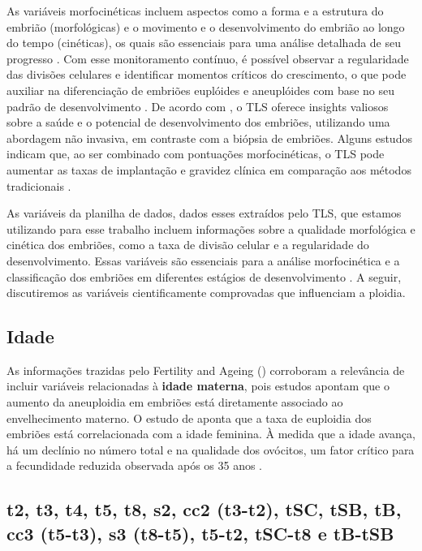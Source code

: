 As variáveis morfocinéticas incluem aspectos como a forma e a estrutura do embrião (morfológicas) e o movimento e o desenvolvimento do embrião ao longo do tempo (cinéticas), os quais são essenciais para uma análise detalhada de seu progresso \cite{gleicher2021}. Com esse monitoramento contínuo, é possível observar a regularidade das divisões celulares e identificar momentos críticos do crescimento, o que pode auxiliar na diferenciação de embriões euplóides e aneuplóides com base no seu padrão de desenvolvimento \cite{boucret2021}. De acordo com , o TLS oferece insights valiosos sobre a saúde e o potencial de desenvolvimento dos embriões, utilizando uma abordagem não invasiva, em contraste com a biópsia de embriões. Alguns estudos indicam que, ao ser combinado com pontuações morfocinéticas, o TLS pode aumentar as taxas de implantação e gravidez clínica em comparação aos métodos tradicionais \cite{boucret2021}.

As variáveis da planilha de dados, dados esses extraídos pelo TLS, que estamos utilizando para esse trabalho incluem informações sobre a qualidade morfológica e cinética dos embriões, como a taxa de divisão celular e a regularidade do desenvolvimento. Essas variáveis são essenciais para a análise morfocinética e a classificação dos embriões em diferentes estágios de desenvolvimento \cite{boucret2021}. A seguir, discutiremos as variáveis cientificamente comprovadas que influenciam a ploidia.

\subsection{Idade}

As informações trazidas pelo Fertility and Ageing () corroboram a relevância de incluir variáveis relacionadas à \textbf{idade materna}, pois estudos apontam que o aumento da aneuploidia em embriões está diretamente associado ao envelhecimento materno. O estudo de  aponta que a taxa de euploidia dos embriões está correlacionada com a idade feminina. À medida que a idade avança, há um declínio no número total e na qualidade dos ovócitos, um fator crítico para a fecundidade reduzida observada após os 35 anos \cite{yuan2023}.

\subsection{t2, t3, t4, t5, t8, s2, cc2 (t3-t2), tSC, tSB, tB, cc3 (t5-t3), s3 (t8-t5), t5-t2,  tSC-t8 e tB-tSB}

